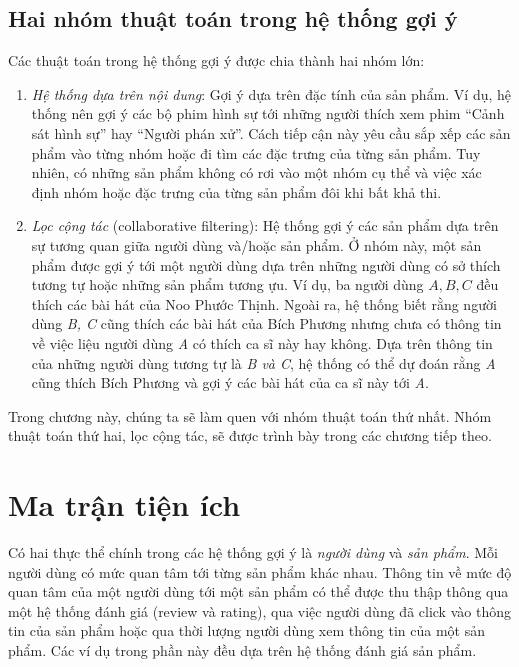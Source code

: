 \subsection{Hai nhóm thuật toán trong hệ thống gợi ý}
Các thuật toán trong hệ thống gợi ý được chia thành hai nhóm lớn:
\begin{enumerate}
\item \textit{Hệ thống dựa trên nội dung}: Gợi ý dựa trên đặc tính của sản
phẩm. Ví dụ, hệ thống nên gợi ý các bộ phim hình sự tới những người thích xem phim ``Cảnh sát hình sự'' hay ``Người phán xử''. Cách tiếp cận này
yêu cầu sắp xếp các sản phẩm vào từng nhóm hoặc đi tìm các đặc
trưng của từng sản phẩm. Tuy nhiên, có những sản phẩm không có
rơi vào một nhóm cụ thể và việc xác định nhóm hoặc đặc trưng của từng sản phẩm đôi khi bất khả thi.


\item \textit{Lọc cộng tác} (collaborative filtering): Hệ thống gợi ý các
sản phẩm dựa trên sự tương quan giữa người dùng và/hoặc sản phẩm. Ở nhóm
này, một sản phẩm được {gợi ý} tới một người dùng dựa trên những người dùng
có sở thích tương tự hoặc những sản phẩm tương ựu. Ví dụ, ba người dùng ${A,
B, C}$ đều thích các bài hát của Noo Phước Thịnh. Ngoài ra, hệ thống biết
rằng người dùng \textit{B, C} cũng thích các bài hát của Bích Phương nhưng
chưa có thông tin về việc liệu người dùng \textit{A} có thích ca sĩ này hay
không. Dựa trên thông tin của những người dùng tương tự là \textit{B và C},
hệ thống có thể dự đoán rằng \textit{A} cũng thích Bích Phương và gợi ý các
bài hát của ca sĩ này tới \textit{A}.

\end{enumerate}
Trong chương này, chúng ta sẽ làm quen với nhóm thuật toán thứ nhất. Nhóm thuật toán thứ hai, lọc cộng tác, sẽ được trình bày trong
các chương tiếp theo.

\section{Ma trận tiện ích}
Có hai thực thể chính trong các hệ thống gợi ý là
\textit{người dùng} và \textit{sản phẩm}. Mỗi người dùng có mức quan tâm tới từng sản phẩm khác nhau. Thông tin về mức độ quan tâm của một người dùng tới một
sản phẩm có thể được thu thập thông qua một hệ thống đánh
giá ({review} và {rating}), qua việc người dùng đã click vào thông tin
của sản phẩm hoặc qua thời lượng người dùng xem thông tin của một sản phẩm. Các ví dụ trong phần này đều dựa trên hệ thống đánh giá sản phẩm.

